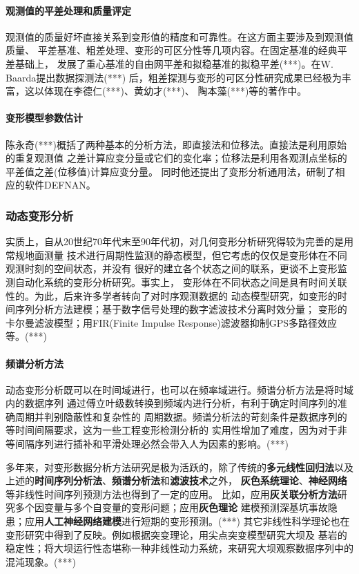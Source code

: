 \paragraph*{观测值的平差处理和质量评定}
观测值的质量好坏直接关系到变形值的精度和可靠性。在这方面主要涉及到观测值质量、
平差基准、粗差处理、变形的可区分性等几项内容。在固定基准的经典平差基础上，
发展了重心基准的自由网平差和拟稳基准的拟稳平差(***)。在W. Baarda提出数据探测法(***)
后，粗差探测与变形的可区分性研究成果已经极为丰富，这以体现在李德仁(***)、黄幼才(***)、
陶本藻(***)等的著作中。
\paragraph*{变形模型参数估计}
陈永奇(***)概括了两种基本的分析方法，即直接法和位移法。直接法是利用原始的重复观测值
之差计算应变分量或它们的变化率；位移法是利用各观测点坐标的平差值之差(位移值)计算应变分量。
同时他还提出了变形分析通用法，研制了相应的软件DEFNAN。

\subsubsection{动态变形分析}
实质上，自从20世纪70年代末至90年代初，对几何变形分析研究得较为完善的是用常规地面测量
技术进行周期性监测的静态模型，但它考虑的仅仅是变形体在不同观测时刻的空间状态，并没有
很好的建立各个状态之间的联系，更谈不上变形监测自动化系统的变形分析研究。事实上，
变形体在不同状态之间是具有时间关联性的。为此，后来许多学者转向了对时序观测数据的
动态模型研究，如变形的时间序列分析方法建模；基于数字信号处理的数字滤波技术分离时效分量；
变形的卡尔曼滤波模型；用FIR(Finite Impulse Response)滤波器抑制GPS多路径效应等。(***)
\paragraph*{频谱分析方法}
动态变形分析既可以在时间域进行，也可以在频率域进行。频谱分析方法是将时域内的数据序列
通过傅立叶级数转换到频域内进行分析，有利于确定时间序列的准确周期并判别隐蔽性和复杂性的
周期数据。频谱分析法的苛刻条件是数据序列的等时间间隔要求，这为一些工程变形检测分析的
实用性增加了难度，因为对于非等间隔序列进行插补和平滑处理必然会带入人为因素的影响。(***)

多年来，对变形数据分析方法研究是极为活跃的，除了传统的\textbf{多元线性回归法}以及
上述的\textbf{时间序列分析法}、\textbf{频谱分析法}和\textbf{滤波技术}之外，
\textbf{灰色系统理论}、\textbf{神经网络}等非线性时间序列预测方法也得到了一定的应用。
比如，应用\textbf{灰关联分析方法}研究多个因变量与多个自变量的变形问题；应用\textbf{灰色理论}
建模预测深基坑事故隐患；应用\textbf{人工神经网络建模}进行短期的变形预测。(***)
其它非线性科学理论也在变形研究中得到了反映。例如根据突变理论，用尖点突变模型研究大坝及
基岩的稳定性；将大坝运行性态堪称一种非线性动力系统，来研究大坝观察数据序列中的混沌现象。(***)

